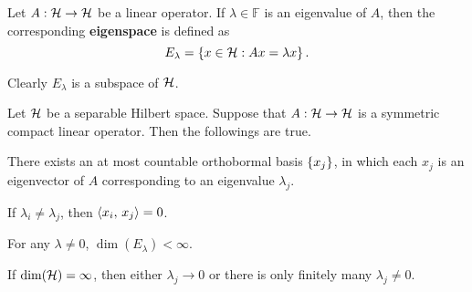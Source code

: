 \begin{definition}
    Let $A:\mathcal{H}\to\mathcal{H}$ be a linear operator. If $\lambda\in\mathbb{F}$ 
    is an eigenvalue of $A$, then the corresponding \textbf{eigenspace} 
    is defined as 
    \begin{equation*}
        E_\lambda = \left\{ {x\in\mathcal{H}: Ax = \lambda x} \right\}.
    \end{equation*}
\end{definition}
\begin{remark}
    Clearly $E_\lambda$ is a subspace of $\mathcal{H}$.
\end{remark}

\begin{theorem}
    Let $\mathcal{H}$ be a separable Hilbert space. Suppose that $A:\mathcal{H}\to\mathcal{H}$ is a symmetric 
    compact linear operator. Then the followings are true.
    \begin{thmenum}
        \item There exists an at most countable orthobormal basis $\left\{ {x_j} \right\}$, in 
        which each $x_j$ is an eigenvector of $A$ corresponding to an eigenvalue $\lambda_j$. 
        \item If $\lambda_i\neq\lambda_j$, then $\left\langle {x_i},\, {x_j} \right\rangle = 0$.
        \item For any $\lambda\neq 0$, $\dim(E_\lambda)<\infty$. 
        \item If $\dim(\mathcal{H}) = \infty$, then either $\lambda_j\to 0$ or there is only 
        finitely many $\lambda_j\neq 0$.
    \end{thmenum}
\end{theorem}
